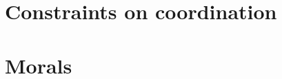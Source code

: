 \documentclass[11pt,article,oneside]{memoir}
\begin{document}

\section{Constraints on coordination}\label{coc}

\section{Morals}\label{dragon}

 

\printbibliography
\end{document}
